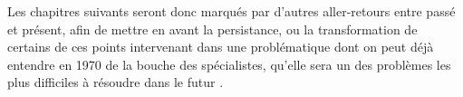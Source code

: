 Les chapitres suivants seront donc marqués par d'autres aller-retours entre passé et présent, afin de mettre en avant la persistance, ou la transformation de certains de ces points intervenant dans une problématique dont on peut déjà entendre en 1970 de la bouche des spécialistes, qu'elle sera un des problèmes les plus difficiles à résoudre dans le futur \autocites{Hermann1967, Naylor1967, Guetzkow1972, Doran1975}.


